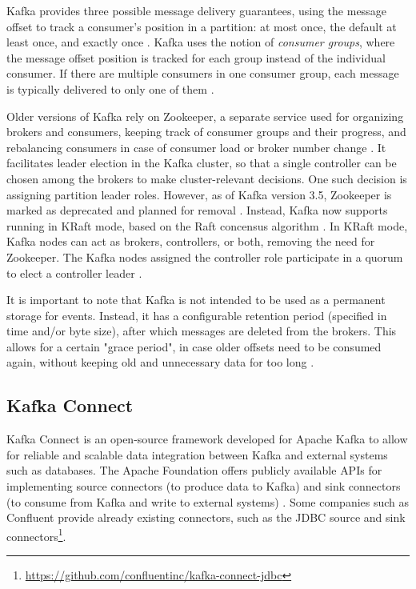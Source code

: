Kafka provides three possible message delivery guarantees, using the message offset to track a consumer's position in a partition: at most once, the default at least once, and exactly once \cite{kafkadocumentation}. Kafka uses the notion of \textit{consumer groups}, where the message offset position is tracked for each group instead of the individual consumer. If there are multiple consumers in one consumer group, each message is typically delivered to only one of them \cite{kreps2011kafka}.

Older versions of Kafka rely on Zookeeper, a separate service used for organizing brokers and consumers, keeping track of consumer groups and their progress, and rebalancing consumers in case of consumer load or broker number change \cite{kreps2011kafka}. It facilitates leader election in the Kafka cluster, so that a single controller can be chosen among the brokers to make cluster-relevant decisions. One such decision is assigning partition leader roles. However, as of Kafka version 3.5, Zookeeper is marked as deprecated and planned for removal \cite{kafkadocumentation}. Instead, Kafka now supports running in KRaft mode, based on the Raft concensus algorithm \cite{ongaroraft2014search}. In KRaft mode, Kafka nodes can act as brokers, controllers, or both, removing the need for Zookeeper. The Kafka nodes assigned the controller role participate in a quorum to elect a controller leader \cite{kafkadocumentation}.

It is important to note that Kafka is not intended to be used as a permanent storage for events. Instead, it has a configurable retention period (specified in time and/or byte size), after which messages are deleted from the brokers. This allows for a certain "grace period", in case older offsets need to be consumed again, without keeping old and unnecessary data for too long \cite{kreps2011kafka}.

\subsection{Kafka Connect}
\label{ch02:fundamentals:apachekafkaandkafkaconnect:kafkaconnect}
Kafka Connect is an open-source framework developed for Apache Kafka to allow for reliable and scalable data integration between Kafka and external systems such as databases. The Apache Foundation offers publicly available \ac{APIs} for implementing source connectors (to produce data to Kafka) and sink connectors (to consume from Kafka and write to external systems) \cite{kafkadocumentation}. Some companies such as Confluent provide already existing connectors, such as the \ac{JDBC} source and sink connectors\footnote{\url{https://github.com/confluentinc/kafka-connect-jdbc}}.

